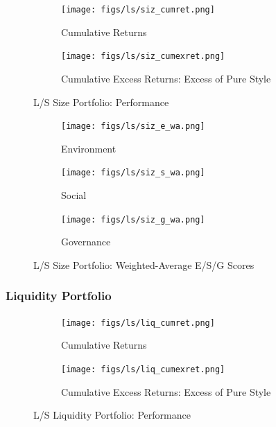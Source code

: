 \documentclass[11pt,a4paper]{article}
\begin{document}
\begin{figure}[h!]
    \centering
    \begin{subfigure}{.5\textwidth}
        \centering
        \texttt{[image: figs/ls/siz\_cumret.png]}
        \caption{Cumulative Returns}
        \label{fig:siz_cumret}
    \end{subfigure}%
    \begin{subfigure}{.5\textwidth}
      \centering
      \texttt{[image: figs/ls/siz\_cumexret.png]}
      \caption{Cumulative Excess Returns: Excess of Pure Style}
      \label{fig:siz_cumexret}
    \end{subfigure}
    \caption{L/S Size Portfolio: Performance}
\end{figure}

\begin{figure}[h!]
    \centering
    \begin{subfigure}{.33\textwidth}
        \centering
        \texttt{[image: figs/ls/siz\_e\_wa.png]}
        \caption{Environment}
        \label{fig:siz_e_wa}
    \end{subfigure}%
    \begin{subfigure}{.33\textwidth}
      \centering
      \texttt{[image: figs/ls/siz\_s\_wa.png]}
      \caption{Social}
      \label{fig:siz_s_wa}
    \end{subfigure}%
    \begin{subfigure}{.33\textwidth}
        \centering
        \texttt{[image: figs/ls/siz\_g\_wa.png]}
        \caption{Governance}
        \label{fig:siz_g_wa}
      \end{subfigure}
    \caption{L/S Size Portfolio: Weighted-Average E/S/G Scores}
\end{figure}

\begin{center}
    
    \label{tab:siz_stats}
\end{center}

\clearpage

\subsubsection{Liquidity Portfolio}

\begin{figure}[h!]
    \centering
    \begin{subfigure}{.5\textwidth}
        \centering
        \texttt{[image: figs/ls/liq\_cumret.png]}
        \caption{Cumulative Returns}
        \label{fig:liq_cumret}
    \end{subfigure}%
    \begin{subfigure}{.5\textwidth}
      \centering
      \texttt{[image: figs/ls/liq\_cumexret.png]}
      \caption{Cumulative Excess Returns: Excess of Pure Style}
      \label{fig:liq_cumexret}
    \end{subfigure}
    \caption{L/S Liquidity Portfolio: Performance}
\end{figure}
\end{document}
